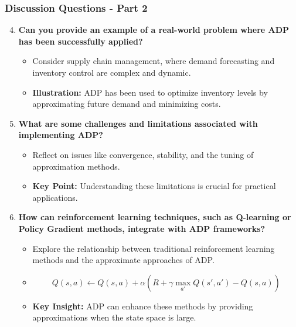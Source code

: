 \documentclass[aspectratio=169]{beamer}
\begin{document}
\begin{frame}[fragile]
    \frametitle{Discussion Questions - Part 2}
    \begin{enumerate}
        \setcounter{enumi}{3}
        \item \textbf{Can you provide an example of a real-world problem where ADP has been successfully applied?}
        \begin{itemize}
            \item Consider supply chain management, where demand forecasting and inventory control are complex and dynamic.
            \item \textbf{Illustration:} ADP has been used to optimize inventory levels by approximating future demand and minimizing costs.
        \end{itemize}

        \item \textbf{What are some challenges and limitations associated with implementing ADP?}
        \begin{itemize}
            \item Reflect on issues like convergence, stability, and the tuning of approximation methods.
            \item \textbf{Key Point:} Understanding these limitations is crucial for practical applications.
        \end{itemize}

        \item \textbf{How can reinforcement learning techniques, such as Q-learning or Policy Gradient methods, integrate with ADP frameworks?}
        \begin{itemize}
            \item Explore the relationship between traditional reinforcement learning methods and the approximate approaches of ADP.
            \item \begin{equation}
                Q(s, a) \leftarrow Q(s, a) + \alpha \left( R + \gamma \max_{a'} Q(s', a') - Q(s, a) \right)
                \end{equation}
            \item \textbf{Key Insight:} ADP can enhance these methods by providing approximations when the state space is large.
        \end{itemize}
    \end{enumerate}
\end{frame}
\end{document}
